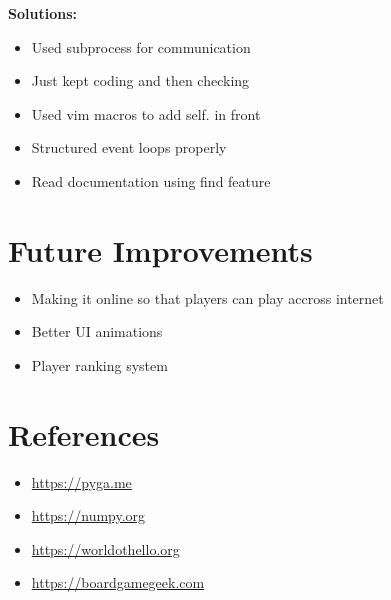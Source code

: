 \documentclass[12pt]{article} %
\begin{document}
\textbf{Solutions:}
\begin{itemize}

    \item Used subprocess for communication
    \item Just kept coding and then checking
    \item Used vim macros to add self. in front
    \item Structured event loops properly
    \item Read documentation using find feature
\end{itemize}

\section{Future Improvements}

\begin{itemize}
    \item Making it online so that players can play accross internet
    \item Better UI animations
    \item Player ranking system
\end{itemize}


\section{References}

\begin{itemize}
    \item \url{https://pyga.me}
    \item \url{https://numpy.org}
    \item \url{https://worldothello.org}
    \item \url{https://boardgamegeek.com}
\end{itemize}
\end{document}
